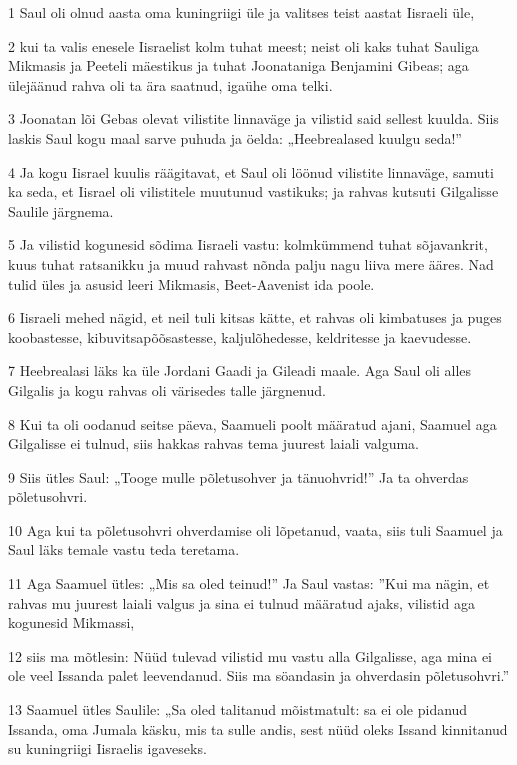 \par 1 Saul oli olnud aasta oma kuningriigi üle ja valitses teist aastat Iisraeli üle,
\par 2 kui ta valis enesele Iisraelist kolm tuhat meest; neist oli kaks tuhat Sauliga Mikmasis ja Peeteli mäestikus ja tuhat Joonataniga Benjamini Gibeas; aga ülejäänud rahva oli ta ära saatnud, igaühe oma telki.
\par 3 Joonatan lõi Gebas olevat vilistite linnaväge ja vilistid said sellest kuulda. Siis laskis Saul kogu maal sarve puhuda ja öelda: „Heebrealased kuulgu seda!”
\par 4 Ja kogu Iisrael kuulis räägitavat, et Saul oli löönud vilistite linnaväge, samuti ka seda, et Iisrael oli vilistitele muutunud vastikuks; ja rahvas kutsuti Gilgalisse Saulile järgnema.
\par 5 Ja vilistid kogunesid sõdima Iisraeli vastu: kolmkümmend tuhat sõjavankrit, kuus tuhat ratsanikku ja muud rahvast nõnda palju nagu liiva mere ääres. Nad tulid üles ja asusid leeri Mikmasis, Beet-Aavenist ida poole.
\par 6 Iisraeli mehed nägid, et neil tuli kitsas kätte, et rahvas oli kimbatuses ja puges koobastesse, kibuvitsapõõsastesse, kaljulõhedesse, keldritesse ja kaevudesse.
\par 7 Heebrealasi läks ka üle Jordani Gaadi ja Gileadi maale. Aga Saul oli alles Gilgalis ja kogu rahvas oli värisedes talle järgnenud.
\par 8 Kui ta oli oodanud seitse päeva, Saamueli poolt määratud ajani, Saamuel aga Gilgalisse ei tulnud, siis hakkas rahvas tema juurest laiali valguma.
\par 9 Siis ütles Saul: „Tooge mulle põletusohver ja tänuohvrid!” Ja ta ohverdas põletusohvri.
\par 10 Aga kui ta põletusohvri ohverdamise oli lõpetanud, vaata, siis tuli Saamuel ja Saul läks temale vastu teda teretama.
\par 11 Aga Saamuel ütles: „Mis sa oled teinud!” Ja Saul vastas: ”Kui ma nägin, et rahvas mu juurest laiali valgus ja sina ei tulnud määratud ajaks, vilistid aga kogunesid Mikmassi,
\par 12 siis ma mõtlesin: Nüüd tulevad vilistid mu vastu alla Gilgalisse, aga mina ei ole veel Issanda palet leevendanud. Siis ma söandasin ja ohverdasin põletusohvri.”
\par 13 Saamuel ütles Saulile: „Sa oled talitanud mõistmatult: sa ei ole pidanud Issanda, oma Jumala käsku, mis ta sulle andis, sest nüüd oleks Issand kinnitanud su kuningriigi Iisraelis igaveseks.

